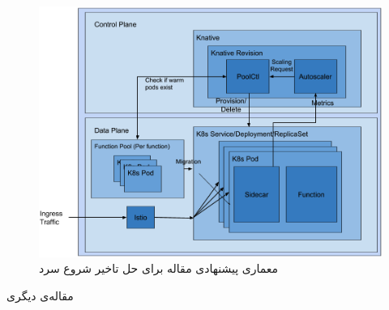 \begin{figure}
	\centering
	\includegraphics[width=\linewidth]{figs/Knative-architecture-modified}
	\caption {معماری پیشنهادی مقاله برای حل تاخیر شروع سرد}
	\label{fig:Knative-architecture-modified}
\end{figure}

\par
\newpage
مقاله‌ی دیگری 